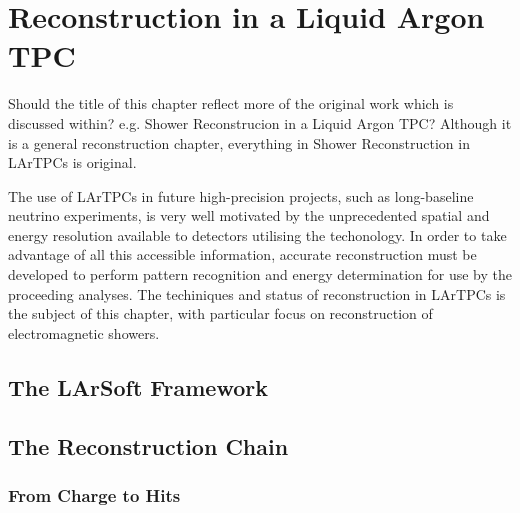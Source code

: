 
\chapter{Reconstruction in a Liquid Argon TPC}\label{chap:LArTPCReconstruction}

{\color{red} Should the title of this chapter reflect more of the original work which is discussed within?  e.g. Shower Reconstrucion in a Liquid Argon TPC?  Although  it is a general reconstruction chapter, everything in Shower Reconstruction in LArTPCs is original.}

The use of LArTPCs in future high-precision projects, such as long-baseline neutrino experiments, is very well motivated by the unprecedented spatial and energy resolution available to detectors utilising the techonology.  In order to take advantage of all this accessible information, accurate reconstruction must be developed to perform pattern recognition and energy determination for use by the proceeding analyses.  The techiniques and status of reconstruction in LArTPCs is the subject of this chapter, with particular focus on reconstruction of electromagnetic showers.



\section{The LArSoft Framework}\label{sec:LArSoft}

\section{The Reconstruction Chain}\label{sec:ReconstructionChain}

\subsection{From Charge to Hits}\label{sec:HitReconstruction}

